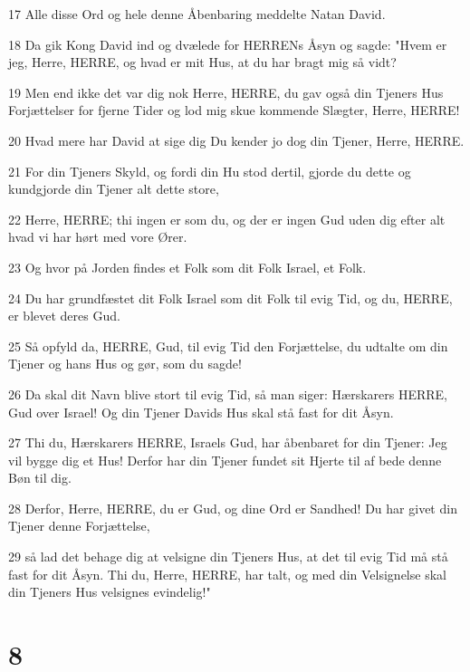 \par 17 Alle disse Ord og hele denne Åbenbaring meddelte Natan David.
\par 18 Da gik Kong David ind og dvælede for HERRENs Åsyn og sagde: "Hvem er jeg, Herre, HERRE, og hvad er mit Hus, at du har bragt mig så vidt?
\par 19 Men end ikke det var dig nok Herre, HERRE, du gav også din Tjeners Hus Forjættelser for fjerne Tider og lod mig skue kommende Slægter, Herre, HERRE!
\par 20 Hvad mere har David at sige dig Du kender jo dog din Tjener, Herre, HERRE.
\par 21 For din Tjeners Skyld, og fordi din Hu stod dertil, gjorde du dette og kundgjorde din Tjener alt dette store,
\par 22 Herre, HERRE; thi ingen er som du, og der er ingen Gud uden dig efter alt hvad vi har hørt med vore Ører.
\par 23 Og hvor på Jorden findes et Folk som dit Folk Israel, et Folk.
\par 24 Du har grundfæstet dit Folk Israel som dit Folk til evig Tid, og du, HERRE, er blevet deres Gud.
\par 25 Så opfyld da, HERRE, Gud, til evig Tid den Forjættelse, du udtalte om din Tjener og hans Hus og gør, som du sagde!
\par 26 Da skal dit Navn blive stort til evig Tid, så man siger: Hærskarers HERRE, Gud over Israel! Og din Tjener Davids Hus skal stå fast for dit Åsyn.
\par 27 Thi du, Hærskarers HERRE, Israels Gud, har åbenbaret for din Tjener: Jeg vil bygge dig et Hus! Derfor har din Tjener fundet sit Hjerte til af bede denne Bøn til dig.
\par 28 Derfor, Herre, HERRE, du er Gud, og dine Ord er Sandhed! Du har givet din Tjener denne Forjættelse,
\par 29 så lad det behage dig at velsigne din Tjeners Hus, at det til evig Tid må stå fast for dit Åsyn. Thi du, Herre, HERRE, har talt, og med din Velsignelse skal din Tjeners Hus velsignes evindelig!"

\chapter{8}

